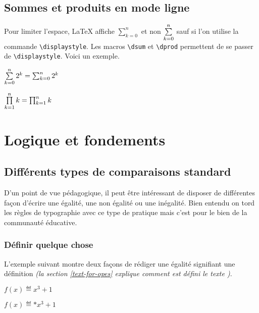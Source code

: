 \documentclass[12pt,a4paper]{article}
\newcommand\env[1]{\texttt{#1}}
\newcommand\macro[1]{\env{\textbackslash{}#1}}
\theoremstyle{definition}
\begin{document}

\subsection{Sommes et produits en mode ligne}

Pour limiter l'espace, \LaTeX{} affiche $\sum_{k=0}^{n}$ et non $\sum\limits_{k=0}^{n}$ sauf si l'on utilise la commande \macro{displaystyle}.
Les macros \macro{dsum} et \macro{dprod} permettent de se passer de \macro{displaystyle}.
Voici un exemple.


\begin{latexex}
 $\sum\limits_{k=0}^{n} 2^k
= \sum_{k=0}^{n} 2^k$

 $\prod\limits_{k=1}^{n} k
= \prod_{k=1}^{n} k$
\end{latexex}


\section{Logique et fondements}

\subsection{Différents types de comparaisons \og standard \fg}

D'un point de vue pédagogique, il peut être intéressant de disposer de différentes façon d'écrire une égalité, une non égalité ou une inégalité.
Bien entendu on tord les règles de typographie avec ce type de pratique mais c'est pour le bien de la communauté éducative.


\subsubsection{Définir quelque chose}

L'exemple suivant montre deux façons de rédiger une égalité signifiant une définition \emph{(la section \ref{text-for-opes} explique comment est défini le texte \emph{\og \textopdef \fg})}.

\begin{latexex}
$f(x) \eqdef x^3 + 1$

$f(x) \eqdef* x^3 + 1$
\end{latexex}
\end{document}
